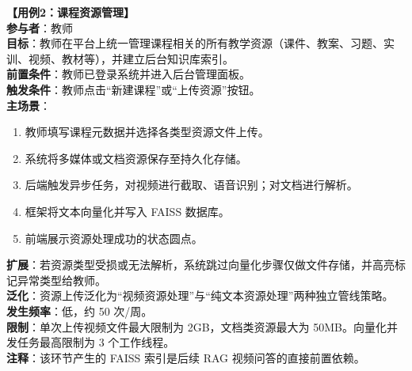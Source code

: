 \vspace{1em}
\noindent\textbf{【用例2：课程资源管理】}\\
\textbf{参与者}：教师\\
\textbf{目标}：教师在平台上统一管理课程相关的所有教学资源（课件、教案、习题、实训、视频、教材等），并建立后台知识库索引。\\
\textbf{前置条件}：教师已登录系统并进入后台管理面板。\\
\textbf{触发条件}：教师点击“新建课程”或“上传资源”按钮。\\
\textbf{主场景}：
\begin{enumerate}
    \item 教师填写课程元数据并选择各类型资源文件上传。
    \item 系统将多媒体或文档资源保存至持久化存储。
    \item 后端触发异步任务，对视频进行截取、语音识别；对文档进行解析。
    \item 框架将文本向量化并写入 FAISS 数据库。
    \item 前端展示资源处理成功的状态圆点。
\end{enumerate}
\textbf{扩展}：若资源类型受损或无法解析，系统跳过向量化步骤仅做文件存储，并高亮标记异常类型给教师。\\
\textbf{泛化}：资源上传泛化为“视频资源处理”与“纯文本资源处理”两种独立管线策略。\\
\textbf{发生频率}：低，约 50 次/周。\\
\textbf{限制}：单次上传视频文件最大限制为 2GB，文档类资源最大为 50MB。向量化并发任务最高限制为 3 个工作线程。\\
\textbf{注释}：该环节产生的 FAISS 索引是后续 RAG 视频问答的直接前置依赖。

